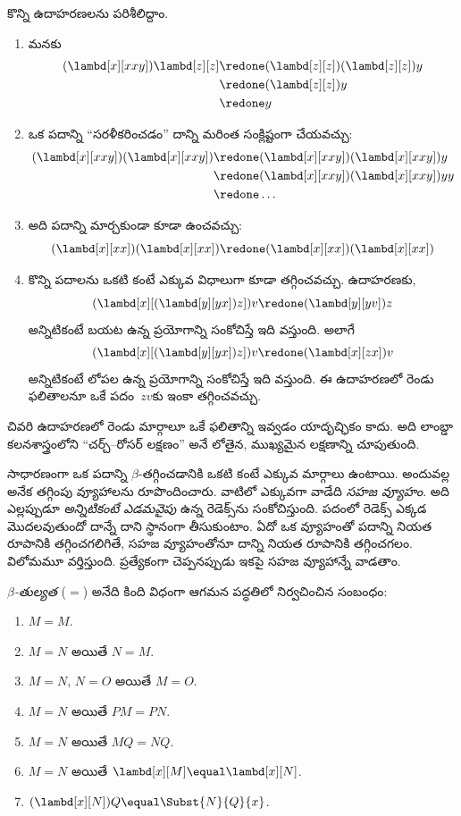 \documentclass[../../../include/open-logic-section]{subfiles}
\begin{document}
కొన్ని ఉదాహరణలను పరిశీలిద్దాం.
\begin{enumerate}
\item మనకు
\begin{align*}
(\lambd[x][xxy]) \lambd[z][z] & \redone (\lambd[z][z])(\lambd[z][z]) y \\
& \redone (\lambd[z][z]) y \\
& \redone y
\end{align*}
\item ఒక పదాన్ని “సరళీకరించడం” దాన్ని మరింత సంక్లిష్టంగా చేయవచ్చు:
\begin{align*}
(\lambd[x][xxy])(\lambd[x][xxy]) & \redone (\lambd[x][xxy])(\lambd[x][xxy])y \\
& \redone (\lambd[x][xxy])(\lambd[x][xxy])yy \\
& \redone \dots
\end{align*}
\item అది పదాన్ని మార్చకుండా కూడా ఉంచవచ్చు:
\[
(\lambd[x][xx])(\lambd[x][xx]) \redone (\lambd[x][xx])(\lambd[x][xx])
\]
\item కొన్ని పదాలను ఒకటి కంటే ఎక్కువ విధాలుగా కూడా తగ్గించవచ్చు.
  ఉదాహరణకు,
\[
(\lambd[x][(\lambd[y][yx]) z]) v \redone (\lambd[y][yv]) z
\]
అన్నిటికంటే బయట ఉన్న ప్రయోగాన్ని సంకోచిస్తే ఇది వస్తుంది. అలాగే
\[
(\lambd[x][(\lambd[y][yx]) z]) v \redone (\lambd[x][zx]) v
\]
అన్నిటికంటే లోపల ఉన్న ప్రయోగాన్ని సంకోచిస్తే ఇది వస్తుంది.
ఈ ఉదాహరణలో రెండు ఫలితాలనూ ఒకే పదం~$zv$కు ఇంకా తగ్గించవచ్చు.
\end{enumerate}

చివరి ఉదాహరణలో రెండు మార్గాలూ ఒకే ఫలితాన్ని ఇవ్వడం యాదృచ్ఛికం కాదు.
అది లాంబ్డా కలనశాస్త్రంలోని “చర్చ్--రోసర్ లక్షణం”
అనే లోతైన, ముఖ్యమైన లక్షణాన్ని చూపుతుంది.

\begin{digress}
  సాధారణంగా ఒక పదాన్ని $\beta$-తగ్గించడానికి ఒకటి కంటే
  ఎక్కువ మార్గాలు ఉంటాయి. అందువల్ల అనేక తగ్గింపు వ్యూహాలను
  రూపొందించారు. వాటిలో ఎక్కువగా వాడేది \emph{సహజ వ్యూహం}.
  అది ఎల్లప్పుడూ \emph{అన్నిటికంటే ఎడమవైపు} ఉన్న రెడెక్స్‌ను
  సంకోచిస్తుంది. పదంలో రెడెక్స్ ఎక్కడ మొదలవుతుందో దాన్నే దాని స్థానంగా తీసుకుంటాం.
  ఏదో ఒక వ్యూహంతో పదాన్ని నియత రూపానికి తగ్గించగలిగితే,
  సహజ వ్యూహంతోనూ దాన్ని నియత రూపానికి తగ్గించగలం. విలోమమూ వర్తిస్తుంది.
  ప్రత్యేకంగా చెప్పనప్పుడు ఇకపై సహజ వ్యూహాన్నే వాడతాం.
\end{digress}

\begin{defn}
  \emph{$\beta$-తుల్యత} ($\equal$) అనేది కింది విధంగా
  ఆగమన పద్ధతిలో నిర్వచించిన సంబంధం:
  \begin{enumerate}
  \item $M \equal M$.
  \item $M \equal N$ అయితే $N \equal M$.
  \item $M \equal N$, $N \equal O$ అయితే $M \equal O$.
  \item $M \equal N$ అయితే $PM \equal PN$.
  \item $M \equal N$ అయితే $MQ \equal NQ$.
  \item $M \equal N$ అయితే $\lambd[x][M] \equal \lambd[x][N]$.
  \item $(\lambd[x][N])Q \equal \Subst{N}{Q}{x}$.
  \end{enumerate}
\end{defn}
\end{document}
